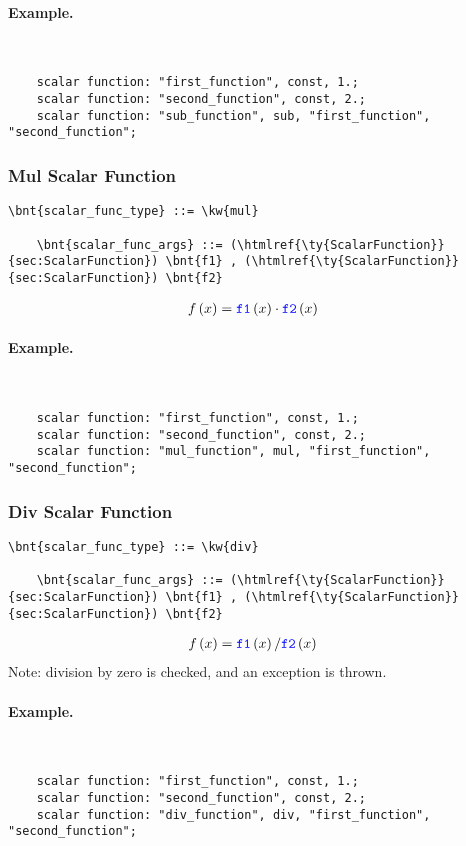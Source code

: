 \paragraph{Example.} \
\begin{verbatim}
    scalar function: "first_function", const, 1.;
    scalar function: "second_function", const, 2.;
    scalar function: "sub_function", sub, "first_function", "second_function";
\end{verbatim}

\subsubsection{Mul Scalar Function}
\begin{Verbatim}[commandchars=\\\{\}]
    \bnt{scalar_func_type} ::= \kw{mul}

    \bnt{scalar_func_args} ::= (\htmlref{\ty{ScalarFunction}}{sec:ScalarFunction}) \bnt{f1} , (\htmlref{\ty{ScalarFunction}}{sec:ScalarFunction}) \bnt{f2}
\end{Verbatim}
\begin{align}
	f\left( x \right)
	&=
	\textcolor{blue}{\texttt{f1}}\left( x \right) \cdot \textcolor{blue}{\texttt{f2}}\left( x \right)
\end{align}

\paragraph{Example.} \
\begin{verbatim}
    scalar function: "first_function", const, 1.;
    scalar function: "second_function", const, 2.;
    scalar function: "mul_function", mul, "first_function", "second_function";
\end{verbatim}

\subsubsection{Div Scalar Function}
\begin{Verbatim}[commandchars=\\\{\}]
    \bnt{scalar_func_type} ::= \kw{div}

    \bnt{scalar_func_args} ::= (\htmlref{\ty{ScalarFunction}}{sec:ScalarFunction}) \bnt{f1} , (\htmlref{\ty{ScalarFunction}}{sec:ScalarFunction}) \bnt{f2}
\end{Verbatim}
\begin{align}
	f\left( x \right)
	&=
	\textcolor{blue}{\texttt{f1}}\left( x \right) / \textcolor{blue}{\texttt{f2}}\left( x \right)
\end{align}
Note: division by zero is checked, and an exception is thrown.

\paragraph{Example.} \
\begin{verbatim}
    scalar function: "first_function", const, 1.;
    scalar function: "second_function", const, 2.;
    scalar function: "div_function", div, "first_function", "second_function";
\end{verbatim}

